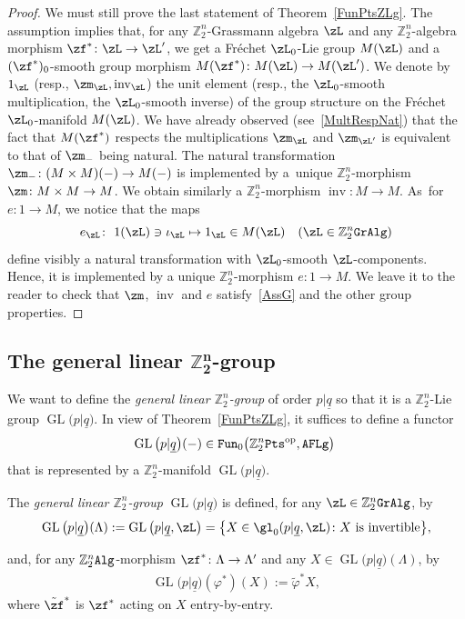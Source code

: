\documentclass[pdftex]{sigma}%
\newcommand{\op}[1]{\operatorname{#1}}
\DeclareMathOperator{\GL}{GL}
\newcommand{\Z}{{\mathbb Z}}
\def\ul{\underline}
\def\ul{\underline}
\newcommand{\0}{\otimes}
\newcommand{\z}{\Z_2^n}
\numberwithin{equation}{section}
\begin{document}
\begin{proof}
We must still prove the last statement of Theorem~\ref{FunPtsZLg}. The assumption implies that, for any $\z$-Grassmann algebra $\zL$ and any $\z$-algebra morphism $\zf^*\colon \zL\to\zL'$, we get a Fr\'echet $\zL_0$-Lie group $M(\zL)$ and a $(\zf^*)_0$-smooth group morphism $M(\zf^*)\colon M(\zL)\to M(\zL')$. We denote by $1_\zL$ (resp., $\zm_\zL,\op{inv}_\zL$) the unit element (resp., the $\zL_0$-smooth multiplication, the $\zL_0$-smooth inverse) of the group structure on the Fr\'echet $\zL_0$-manifold $M(\zL)$. We have already observed (see~\eqref{MultRespNat}) that the fact that $M(\zf^*)$ respects the multiplications $\zm_\zL$ and $\zm_{\zL'}$ is equivalent to that of $\zm_-$ being natural. The natural transformation $\zm_-\colon (M\times M)(-)\to M(-)$ is implemented by a~unique $\z$-morphism $\zm\colon M\times M\to M$. We obtain similarly a $\z$-morphism $\op{inv}\colon M\to M$. As~for $e\colon 1\to M$, we notice that the maps
\[
e_\zL\colon \ 1(\zL)\ni\iota_\zL\mapsto 1_\zL\in M(\zL)\quad (\zL\in\z{\tt GrAlg})
\]
 define visibly a natural transformation with $\zL_0$-smooth $\zL$-components. Hence, it is implemented by a unique $\z$-morphism $e\colon 1\to M$. We leave it to the reader to check that $\zm$, $\op{inv}$ and $e$ satisfy~\eqref{AssG} and the other group properties. \end{proof}

\subsection[The general linear Z2n-group]{The general linear $\boldsymbol{\Z_2^n}$-group}
We want to define the {\it general linear $\z$-group} of order $p|\ul q$ so that it is a $\z$-Lie group $\op{GL}\big(p|\ul q\big)$. In view of Theorem~\ref{FunPtsZLg}, it suffices to define a functor
\[
\op{GL}\big(p|\ul q\big)(-)\in{\tt Fun}_0\big(\z{\tt Pts}^{\op{op}},{\tt AFLg}\big)\;
\]
 that is represented by a $\z$-manifold $\op{GL}\big(p|\ul q\big)$.

\begin{Definition}\label{def:GLp|q}
The \emph{general linear $\Z_2^n$-group} $\op{GL}\big(p|\ul q\big)$ is defined, for any $\zL\in\z{\tt GrAlg}$, by
%
\[
\GL\big(p|\ul{q}\big)(\Lambda) := \op{GL}\big(p|\ul q,\zL\big)=\big\{ X \in \gl_0(p|\ul{q},\zL)\colon X \textnormal{ is invertible} \big \},
\]

%
and, for any $\z{\tt Alg}$-morphism $\zf^* \colon \Lambda \rightarrow \Lambda'$ and any $X\in\GL\big(p|\ul{q}\big)(\Lambda)$, by
%
\begin{align*}
\GL\big(p|\ul{q}\big)(\varphi^*)(X):=\tilde\varphi^*X,
\end{align*}
%
where $\tilde\zf^*$ is $\zf^*$ acting on $X$ entry-by-entry.\end{Definition}
\end{document}
